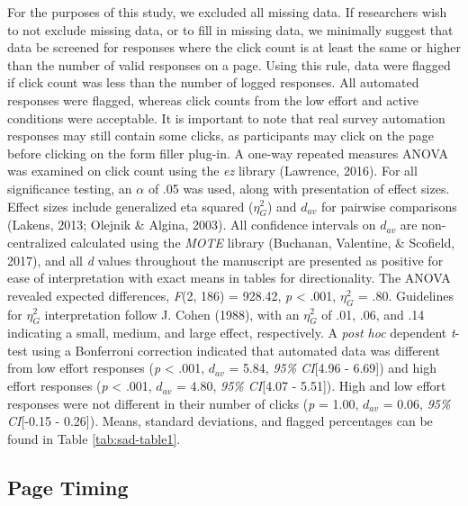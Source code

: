 \documentclass[english,man]{apa6}
\theoremstyle{definition}
\theoremstyle{definition}
\theoremstyle{definition}
\theoremstyle{remark}
\begin{document}
For the purposes of this study, we excluded all missing data. If
researchers wish to not exclude missing data, or to fill in missing
data, we minimally suggest that data be screened for responses where the
click count is at least the same or higher than the number of valid
responses on a page. Using this rule, data were flagged if click count
was less than the number of logged responses. All automated responses
were flagged, whereas click counts from the low effort and active
conditions were acceptable. It is important to note that real survey
automation responses may still contain some clicks, as participants may
click on the page before clicking on the form filler plug-in. A one-way
repeated measures ANOVA was examined on click count using the \emph{ez}
library (Lawrence, 2016). For all significance testing, an \(\alpha\) of
.05 was used, along with presentation of effect sizes. Effect sizes
include generalized eta squared (\(\eta_G^2\)) and \(d_{av}\) for
pairwise comparisons (Lakens, 2013; Olejnik \& Algina, 2003). All
confidence intervals on \(d_{av}\) are non-centralized calculated using
the \emph{MOTE} library (Buchanan, Valentine, \& Scofield, 2017), and
all \emph{d} values throughout the manuscript are presented as positive
for ease of interpretation with exact means in tables for
directionality. The ANOVA revealed expected differences, \emph{F}(2,
186) = 928.42, \emph{p} \textless{} .001, \(\eta_G^2\) = .80. Guidelines
for \(\eta_G^2\) interpretation follow J. Cohen (1988), with an
\(\eta_G^2\) of .01, .06, and .14 indicating a small, medium, and large
effect, respectively. A \emph{post hoc} dependent \emph{t}-test using a
Bonferroni correction indicated that automated data was different from
low effort responses (\emph{p} \textless{} .001, \(d_{av}\) = 5.84,
\emph{95\% CI}{[}4.96 - 6.69{]}) and high effort responses (\emph{p}
\textless{} .001, \(d_{av}\) = 4.80, \emph{95\% CI}{[}4.07 - 5.51{]}).
High and low effort responses were not different in their number of
clicks (\emph{p} = 1.00, \(d_{av}\) = 0.06, \emph{95\% CI}{[}-0.15 -
0.26{]}). Means, standard deviations, and flagged percentages can be
found in Table \ref{tab:sad-table1}.

\subsection{Page Timing}\label{page-timing-1}
\end{document}
